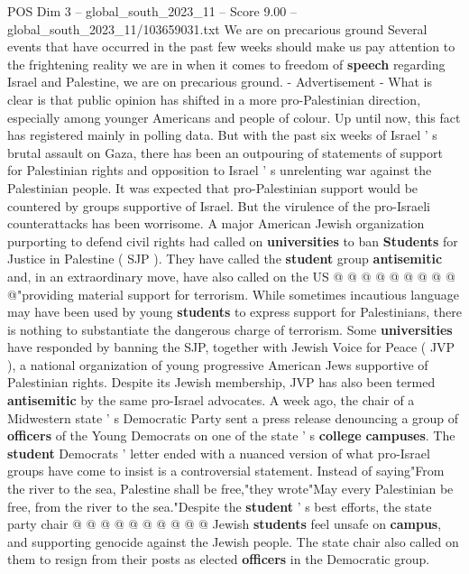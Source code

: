 \begin{textsample}{POS Dim 3 – global\_south\_2023\_11 – Score 9.00 – global\_south\_2023\_11/103659031.txt}  \label{ex:f3_pos_375}
We are on precarious ground Several events that have occurred in the past few weeks should make us pay attention to the frightening reality we are in when it comes to freedom of \textbf{speech} regarding Israel and Palestine, we are on precarious ground. - Advertisement - What is clear is that public opinion has shifted in a more pro-Palestinian direction, especially among younger Americans and people of colour.
Up until now, this fact has registered mainly in polling data.
But with the past six weeks of Israel ' s brutal assault on Gaza, there has been an outpouring of statements of support for Palestinian rights and opposition to Israel ' s unrelenting war against the Palestinian people.
It was expected that pro-Palestinian support would be countered by groups supportive of Israel.
But the virulence of the pro-Israeli counterattacks has been worrisome.
A major American Jewish organization purporting to defend civil rights had called on \textbf{universities} to ban \textbf{Students} for Justice in Palestine ( SJP ).
They have called the \textbf{student} group \textbf{antisemitic} and, in an extraordinary move, have also called on the US @ @ @ @ @ @ @ @ @ @"providing material support for terrorism.
While sometimes incautious language may have been used by young \textbf{students} to express support for Palestinians, there is nothing to substantiate the dangerous charge of terrorism.
Some \textbf{universities} have responded by banning the SJP, together with Jewish Voice for Peace ( JVP ), a national organization of young progressive American Jews supportive of Palestinian rights.
Despite its Jewish membership, JVP has also been termed \textbf{antisemitic} by the same pro-Israel advocates.
A week ago, the chair of a Midwestern state ' s Democratic Party sent a press release denouncing a group of \textbf{officers} of the Young Democrats on one of the state ' s \textbf{college} \textbf{campuses}.
The \textbf{student} Democrats ' letter ended with a nuanced version of what pro-Israel groups have come to insist is a controversial statement.
Instead of saying"From the river to the sea, Palestine shall be free,"they wrote"May every Palestinian be free, from the river to the sea."Despite the \textbf{student} ' s best efforts, the state party chair @ @ @ @ @ @ @ @ @ @ Jewish \textbf{students} feel unsafe on \textbf{campus}, and supporting genocide against the Jewish people.
The state chair also called on them to resign from their posts as elected \textbf{officers} in the Democratic group.

\end{textsample}
